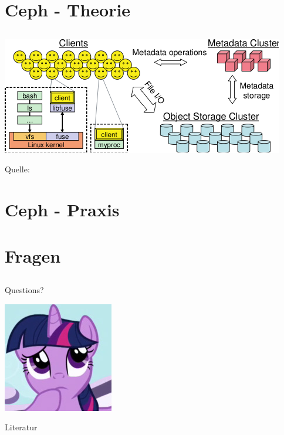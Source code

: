 \documentclass[notes=hide,yellow]{beamer}
\begin{document}
\section{Ceph - Theorie}
\subsection*{}
\begin{frame}
	\begin{center}
		\includegraphics{ceph_architecture.pdf}
	\end{center}
	Quelle: \cite{weil2006}
\end{frame}


\begin{frame}

\end{frame}


\section{Ceph - Praxis}
\subsection*{}
\begin{frame}

\end{frame}

\section{Fragen}
\subsection*{}
\begin{frame}
	\begin{center}
	\large Questions?
	\end{center}
	
	\begin{center}
	\includegraphics[scale=0.8]{questions.jpg}
	\end{center}
\end{frame}

\begin{frame}{Literatur}
	
		
\end{frame}
\end{document}
